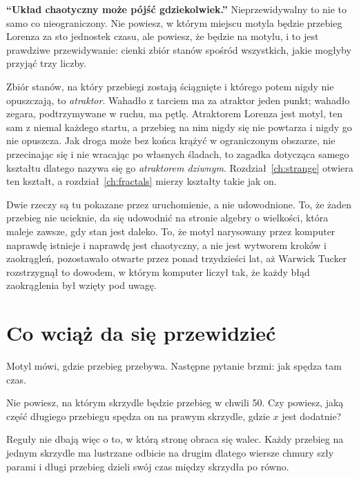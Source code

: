 \begin{trapbox}
\textbf{\enquote{Układ chaotyczny może pójść gdziekolwiek.}}
Nieprzewidywalny to nie to samo co nieograniczony. Nie powiesz, w którym
miejscu motyla będzie przebieg Lorenza za sto jednostek czasu, ale powiesz,
że będzie na motylu, i to jest prawdziwe przewidywanie: cienki zbiór stanów
spośród wszystkich, jakie mogłyby przyjąć trzy liczby.
\end{trapbox}

\noindent
Zbiór stanów, na który przebiegi zostają ściągnięte i którego potem nigdy
nie opuszczają, to \emph{atraktor}. Wahadło z tarciem ma za atraktor jeden
punkt; wahadło zegara, podtrzymywane w ruchu, ma pętlę. Atraktorem Lorenza
jest motyl, ten sam z niemal każdego startu, a przebieg na nim nigdy się
nie powtarza i nigdy go nie opuszcza. Jak droga może bez końca krążyć w
ograniczonym obszarze, nie przecinając się i nie wracając po własnych
śladach, to zagadka dotycząca samego kształtu \dash{} dlatego nazywa się go
\emph{atraktorem dziwnym}. Rozdział~\ref{ch:strange} otwiera ten kształt, a
rozdział~\ref{ch:fractals} mierzy kształty takie jak on.

\begin{rigourbox}
Dwie rzeczy są tu pokazane przez uruchomienie, a nie udowodnione. To, że
żaden przebieg nie ucieknie, da się udowodnić na stronie algebry o
wielkości, która maleje zawsze, gdy stan jest daleko. To, że motyl
narysowany przez komputer naprawdę istnieje i naprawdę jest chaotyczny, a
nie jest wytworem kroków i zaokrągleń, pozostawało otwarte przez ponad
trzydzieści lat, aż Warwick Tucker rozstrzygnął to dowodem, w którym
komputer liczył tak, że każdy błąd zaokrąglenia był wzięty pod uwagę.
\end{rigourbox}

\section{Co wciąż da się przewidzieć}
\label{sec:ch09-statistics}

\noindent
Motyl mówi, gdzie przebieg przebywa. Następne pytanie brzmi: jak spędza tam
czas.

\begin{think}
Nie powiesz, na którym skrzydle będzie przebieg w chwili 50. Czy powiesz,
jaką część długiego przebiegu spędza on na prawym skrzydle, gdzie $x$ jest
dodatnie?
\end{think}
Reguły nie dbają więc o to, w którą stronę obraca się walec. Każdy przebieg na
jednym skrzydle ma lustrzane odbicie na drugim \dash{} dlatego wiersze
chmury szły parami \dash{} i długi przebieg dzieli swój czas między skrzydła
po równo.

